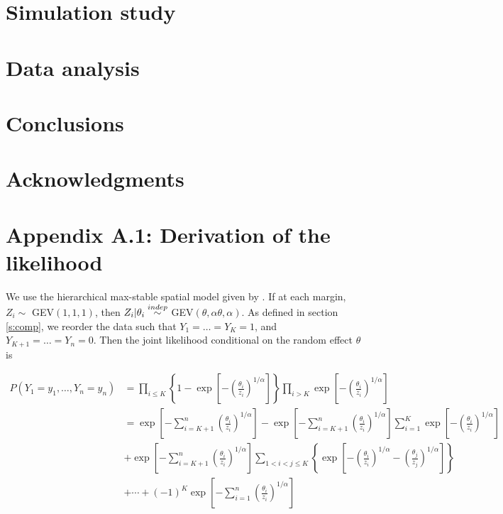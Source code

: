 \documentclass[11pt]{article}
\begin{document}
\section{Simulation study}\label{s:sim}

\section{Data analysis}\label{s:analysis}

\section{Conclusions}\label{s:con}

\section*{Acknowledgments}

\section*{Appendix A.1: Derivation of the likelihood}
We use the hierarchical max-stable spatial model given by \citet{reich-2012}. If at each margin, $Z_i \sim $ GEV$(1,1,1)$, then $Z_i | \theta_i \stackrel{indep}{\sim} $ GEV$(\theta, \alpha \theta, \alpha)$. As defined in section \ref{s:comp}, we reorder the data such that $Y_1=\ldots=Y_K=1$, and $Y_{K+1} = \ldots = Y_n = 0$. Then the joint likelihood conditional on the random effect $\theta$ is

\begin{align} \label{joint_cond}
	P(Y_1=y_1,\ldots,Y_n=y_n) &= \prod_{ i \le K } \left\{ 1 - \exp \left[ - \left( \frac{ \theta_i }{ z_i } \right)^{ 1/\alpha} \right] \right \} \prod_{ i > K } \exp \left[ -\left( \frac{ \theta_i }{ z_i } \right)^{1/\alpha} \right] \nonumber \\[0.5em]
		&= \exp \left[ -\sum_{ i = K+1}^{ n }\left( \frac{ \theta_i }{ z_i } \right)^{1/\alpha} \right] - \exp \left[ -\sum_{ i = K+1}^{ n }\left( \frac{ \theta_i }{ z_i } \right)^{1/\alpha} \right] \sum_{ i = 1}^{K} \exp\left[ -\left( \frac{ \theta_i }{ z_i } \right)^{ 1/\alpha} \right] \nonumber\\
		&  + \exp \left[ -\sum_{ i = K+1}^{ n }\left( \frac{ \theta_i }{ z_i } \right)^{1/\alpha} \right] \sum_{ 1 < i < j \le K } \left\{ \exp \left[ - \left( \frac{ \theta_i }{ z_i } \right)^{ 1/\alpha} - \left( \frac{ \theta_j }{ z_j } \right)^{ 1/\alpha } \right] \right \} \nonumber \\[0.5em]
		& + \cdots + (-1)^K \exp\left[ - \sum_{ i = 1 }^{ n }\left( \frac{ \theta_i }{ z_i } \right)^{ 1/\alpha} \right]
\end{align}
\end{document}
